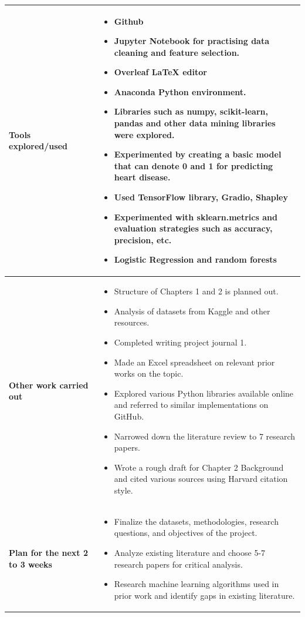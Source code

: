 \begin{longtable}{|p{4cm}|p{11cm}|}
\hline
\textbf{Tools explored/used} & 
\begin{itemize}
    \item Github
    \item Jupyter Notebook for practising data cleaning and feature selection.
    \item Overleaf LaTeX editor
    \item Anaconda Python environment.
    \item Libraries such as numpy, scikit-learn, pandas and other data mining libraries were explored.
    \item Experimented by creating a basic model that can denote 0 and 1 for predicting heart disease.
    \item Used TensorFlow library, Gradio, Shapley
    \item Experimented with sklearn.metrics and evaluation strategies such as accuracy, precision, etc.
    \item Logistic Regression and random forests
\end{itemize} \\
\hline
\textbf{Other work carried out} &
\begin{itemize}
    \item Structure of Chapters 1 and 2 is planned out.
    \item Analysis of datasets from Kaggle and other resources.
    \item Completed writing project journal 1.
    \item Made an Excel spreadsheet on relevant prior works on the topic.
    \item Explored various Python libraries available online and referred to similar implementations on GitHub.
    \item Narrowed down the literature review to 7 research papers.
    \item Wrote a rough draft for Chapter 2 Background and cited various sources using Harvard citation style.
\end{itemize} \\
\hline
\textbf{Plan for the next 2 to 3 weeks} &
\begin{itemize}
    \item Finalize the datasets, methodologies, research questions, and objectives of the project.
    \item Analyze existing literature and choose 5-7 research papers for critical analysis.
    \item Research machine learning algorithms used in prior work and identify gaps in existing literature.

\end{itemize}
\end{longtable}
